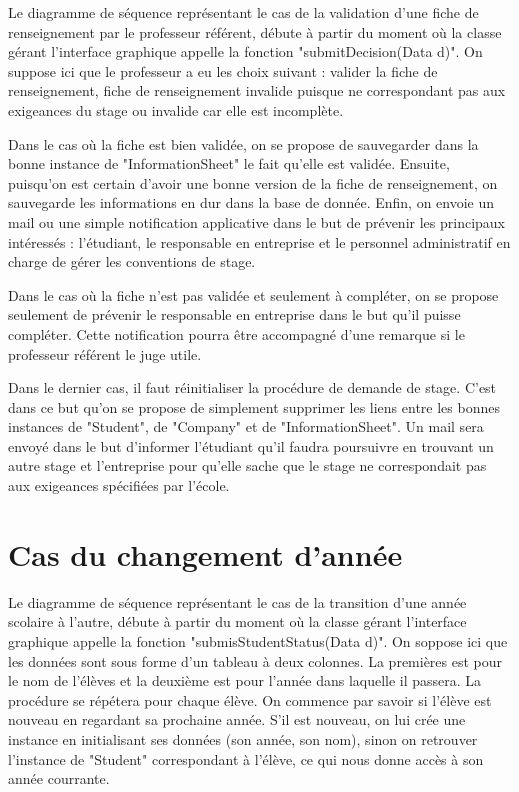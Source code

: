 \documentclass{scrreprt}
\begin{document}
Le diagramme de séquence représentant le cas de la validation d'une fiche de renseignement par le professeur référent, débute 
à partir du moment où la classe gérant l'interface graphique appelle la fonction "submitDecision(Data d)". On suppose ici que 
le professeur a eu les choix suivant : valider la fiche de renseignement, fiche de renseignement invalide puisque ne correspondant 
pas aux exigeances du stage ou invalide car elle est incomplète. 

Dans le cas où la fiche est bien validée, on se propose de sauvegarder dans la bonne instance de "InformationSheet" le fait qu'elle est 
validée. Ensuite, puisqu'on est certain d'avoir une bonne version de la fiche de renseignement, on sauvegarde les informations en dur 
dans la base de donnée. Enfin, on envoie un mail ou une simple notification applicative dans le but de prévenir les principaux intéressés :
l'étudiant, le responsable en entreprise et le personnel administratif en charge de gérer les conventions de stage.

Dans le cas où la fiche n'est pas validée et seulement à compléter, on se propose seulement de prévenir le responsable en entreprise dans 
le but qu'il puisse compléter. Cette notification pourra être accompagné d'une remarque si le professeur référent le juge utile. 

Dans le dernier cas, il faut réinitialiser la procédure de demande de stage. C'est dans ce but qu'on se propose de simplement supprimer 
les liens entre les bonnes instances de "Student", de "Company" et de "InformationSheet". Un mail sera envoyé dans le but d'informer l'étudiant
qu'il faudra poursuivre en trouvant un autre stage et l'entreprise pour qu'elle sache que le stage ne correspondait pas aux exigeances spécifiées
par l'école. 

\newpage

\newpage
\section{Cas du changement d'année}

Le diagramme de séquence représentant le cas de la transition d'une année scolaire à l'autre, débute à partir du moment
où la classe gérant l'interface graphique appelle la fonction "submisStudentStatus(Data d)". On soppose ici que les données
sont sous forme d'un tableau à deux colonnes. La premières est pour le nom de l'élèves et la deuxième est pour l'année dans laquelle
il passera. La procédure se répétera pour chaque élève. On commence par savoir si l'élève est nouveau en regardant sa prochaine année.
S'il est nouveau, on lui crée une instance en initialisant ses données (son année, son nom), sinon on retrouver l'instance de "Student" 
correspondant à l'élève, ce qui nous donne accès à son année courrante. 
\end{document}
